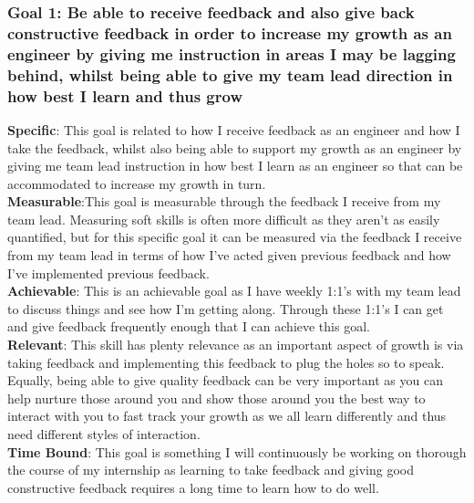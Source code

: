 \documentclass[11pt]{article} %
\begin{document}
\subsubsection{Goal 1: Be able to receive feedback and also give back constructive feedback in order to increase my growth as an engineer by giving me instruction in areas I may be lagging behind, whilst being able to give my team lead direction in how best I learn and thus grow}
\textbf{Specific}: This goal is related to how I receive feedback as an engineer and how I take the feedback,  whilst also being able to support my growth as an engineer by giving me team lead instruction in how best I learn as an engineer so that can be accommodated to increase my growth in turn. 
\\ \textbf{Measurable}:This goal is measurable through the feedback I receive from my team lead.  Measuring soft skills is often more difficult as they aren't as easily quantified,  but for this specific goal it can be measured via the feedback I receive from my team lead in terms of how I've acted given previous feedback and how I've implemented previous feedback.
\\ \textbf{Achievable}: This is an achievable goal as I have weekly 1:1's with my team lead to discuss things and see how I'm getting along.  Through these 1:1's I can get and give feedback frequently enough that I can achieve this goal. 
\\ \textbf{Relevant}: This skill has plenty relevance as an important aspect of growth is via taking feedback and implementing this feedback to plug the holes so to speak.  Equally,  being able to give quality feedback can be very important as you can help nurture those around you and show those around you the best way to interact with you to fast track your growth as we all learn differently and thus need different styles of interaction.
\\ \textbf{Time Bound}: This goal is something I will continuously be working on thorough the course of my internship as learning to take feedback and giving good constructive feedback requires a long time to learn how to do well. 
\end{document}

